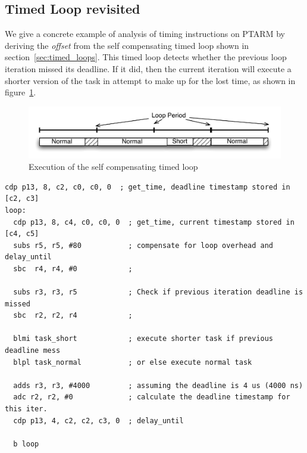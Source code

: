 \subsection{Timed Loop revisited}
We give a concrete example of analysis of timing instructions on PTARM by deriving the \emph{offset} from the self compensating timed loop shown in section~\ref{sec:timed_loops}.
This timed loop detects whether the previous loop iteration missed its deadline. 
If it did, then the current iteration will execute a shorter version of the task in attempt to make up for the lost time, as shown in figure~\ref{fig:self_compensating_loop_timing}.  
\begin{figure}[h]
  \vspace{-3mm}
  \begin{center}
    \includegraphics[scale=.7]{figs/self_compensating_loop_timing}
  \end{center}
  \vspace{-3mm}
  \caption{Execution of the self compensating timed loop}
  \label{fig:self_compensating_loop_timing}
\end{figure}
\vspace{-8mm}
\begin{lstlisting}[float=h, label=lst:timed_loop_compensate_revisit,caption=Timed loops with compensation revisited]
  cdp p13, 8, c2, c0, c0, 0  ; get_time, deadline timestamp stored in [c2, c3]
loop:
  cdp p13, 8, c4, c0, c0, 0  ; get_time, current timestamp stored in [c4, c5]
  subs r5, r5, #80           ; compensate for loop overhead and delay_until 
  sbc  r4, r4, #0            ; 

  subs r3, r3, r5            ; Check if previous iteration deadline is missed
  sbc  r2, r2, r4            ; 

  blmi task_short            ; execute shorter task if previous deadline mess 
  blpl task_normal           ; or else execute normal task 
  
  adds r3, r3, #4000         ; assuming the deadline is 4 us (4000 ns)
  adc r2, r2, #0             ; calculate the deadline timestamp for this iter.
  cdp p13, 4, c2, c2, c3, 0  ; delay_until
   
  b loop
\end{lstlisting}

